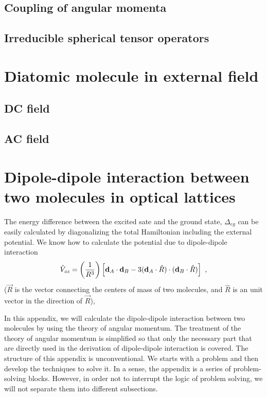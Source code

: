 \subsection{Coupling of angular momenta}

\subsection{Irreducible spherical tensor operators}



\section{Diatomic molecule in external field}
\label{sec:moleculeInField}

\subsection{DC field}
\label{sec:dcField}

\subsection{AC field}
\label{sec:acField}



\section{Dipole-dipole interaction between two molecules in optical lattices}
\label{sec::ddInteraction}

The energy difference between the excited sate and the ground state, $\Delta_{eg}$ can be easily calculated by diagonalizing  the total Hamiltonian including the external potential. We know how to calculate the potential due to dipole-dipole interaction 
\begin{equation}
\hat{V}_{\mbox{\tiny dd}} = \left(\frac{1}{R^3}\right)\left[ \mathbf{d}_{A}\cdot\mathbf{d}_{B}-3(\mathbf{d}_{A}\cdot\hat{R})\cdot(\mathbf{d}_{B}\cdot\hat{R})\right] \ , \nonumber
\end{equation}
($\vec{R}$ is the vector connecting the centers of mass of two molecules, and $\hat{R}$ is an unit vector in the direction of $\vec{R}$), 


In this appendix, we will calculate the dipole-dipole interaction between two molecules by using the theory of angular momentum. The treatment of the theory of angular momentum is simplified so that only the necessary part that are directly used in the derivation of dipole-dipole interaction is covered. The structure of this appendix is  unconventional. We starts with a problem and then develop the techniques to solve it. In a sense, the appendix is a series of problem-solving blocks. However, in order not to interrupt the logic of problem solving, we will not separate them into different subsections. 

